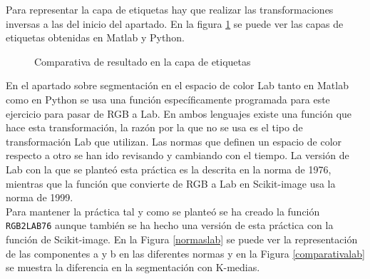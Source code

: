 Para representar la capa de etiquetas hay que realizar las transformaciones inversas a las del inicio del apartado. En la figura \ref{comprgb} se puede ver las capas de etiquetas obtenidas en Matlab y Python. \\

\begin{figure}[!tbp]
  \centering
  \hfill
  \caption{Comparativa de resultado en la capa de etiquetas}
  \label{comprgb}
\end{figure}

En el apartado sobre segmentación en el espacio de color Lab tanto en Matlab como en Python se usa una función específicamente programada para este ejercicio para pasar de RGB a Lab. En ambos lenguajes existe una función que hace esta transformación, la razón por la que no se usa es el tipo de transformación Lab que utilizan. Las normas que definen un espacio de color respecto a otro se han ido revisando y cambiando con el tiempo. La versión de Lab con la que se planteó esta práctica es la descrita en la norma de 1976\cite{lab76}, mientras que la función que convierte de RGB a Lab en Scikit-image usa la norma de 1999\cite{labscikit}.\\

 Para mantener la práctica tal y como se planteó se ha creado la función \texttt{RGB2LAB76} aunque también se ha hecho una versión de esta práctica con la función de Scikit-image. En la Figura \ref{normaslab} se puede ver la representación de las componentes a y b en las diferentes normas y en la Figura \ref{comparativalab} se muestra la diferencia en la segmentación con K-medias.\\

